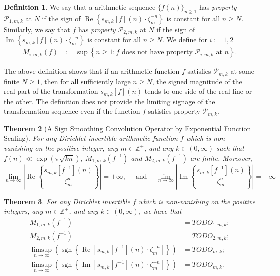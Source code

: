 \documentclass[11pt,reqno]{amsart}
\numberwithin{figure}{section}
\numberwithin{table}{section}
\DeclareMathOperator{\sgn}{sgn}
\renewcommand{\Re}{\operatorname{Re}}
\renewcommand{\Im}{\operatorname{Im}}
\theoremstyle{plain}
\newtheorem{theorem}{Theorem}
\numberwithin{theorem}{section}
\theoremstyle{definition}
\newtheorem{definition}[theorem]{Definition}
\begin{document}
\begin{definition}
We say that a arithmetic sequence $\{f(n)\}_{n \geq 1}$ has 
\emph{property $\mathcal{P}_{1,m,k}$} at $N$ if the sign of $\Re\left\{s_{m,k}[f](n) \cdot \zeta_m^{-n}\right\}$ 
is constant for all $n \geq N$. Similarly, we say that $f$ has 
\emph{property $\mathcal{P}_{2,m,k}$} at $N$ if the sign of $\Im\left\{s_{m,k}[f](n) \cdot \zeta_m^{-n}\right\}$ 
is constant for all $n \geq N$. 
We define for $i := 1,2$ 
\begin{align*} 
M_{i,m,k}(f) & := \sup \left\{n \geq 1: f \text{\ does not have property\ } \mathcal{P}_{i,m,k} \text{\ at\ } n\right\}. 
\end{align*} 
\end{definition} 

The above definition shows that if an arithmetic function $f$ satisfies $\mathcal{P}_{m,k}$ at some finite $N \geq 1$, then 
for all sufficiently large $n \geq N$, the signed magnitude of the real part of the transformation 
$s_{m,k}[f](n)$ tends to one side of the real line or the other. The definition does not provide the limiting signage of the 
transformation sequence even if the function $f$ satisfies property $\mathcal{P}_{m,k}$. 

\begin{theorem}[A Sign Smoothing Convolution Operator by Exponential Function Scaling] 
\label{theorem_MainTheorem_Stmt_v1} 
For any Dirichlet invertible arithmetic function $f$ which is non-vanishing on the positive integer, 
any $m \in \mathbb{Z}^{+}$, and any $k \in (0, \infty)$ such that 
$f(n) \ll \exp(\pi\sqrt{kn})$, $M_{1,m,k}(f^{-1})$ and $M_{2,m,k}(f^{-1})$ are finite. Moreover, 
\[
\lim_{n \rightarrow \infty} \left\lvert \Re\left\{\frac{s_{m,k}[f^{-1}](n)}{\zeta_m^n}\right\} \right\rvert = +\infty, 
     \quad\text{ and }\quad 
\lim_{n \rightarrow \infty} \left\lvert \Im\left\{\frac{s_{m,k}[f^{-1}](n)}{\zeta_m^n}\right\} \right\rvert = +\infty
\]
\end{theorem} 

\begin{theorem} 
\label{theorem_Intro_InitBounds} 
For any Dirichlet invertible $f$ which is non-vanishing on the positive integers, 
any $m \in \mathbb{Z}^{+}$, and any $k \in (0, \infty)$, we have that 
\begin{align}
\tag{A.1} 
M_{1,m,k}(f^{-1}) & = TODO_{1,m,k}; \\ 
\tag{A.2} 
M_{2,m,k}(f^{-1}) & = TODO_{2,m,k}; \\ 
\tag{B} 
\limsup_{n \rightarrow \infty} \left(\sgn\left\{\Re\left[s_{m,k}[f^{-1}](n) \cdot \zeta_m^{-n}\right]\right\}\right) & = 
     TODO_{m,k}; \\ 
\tag{C} 
\limsup_{n \rightarrow \infty} \left(\sgn\left\{\Im\left[s_{m,k}[f^{-1}](n) \cdot \zeta_m^{-n}\right]\right\}\right) & = 
     TODO_{m,k}.
\end{align} 
\end{theorem}
\end{document}
